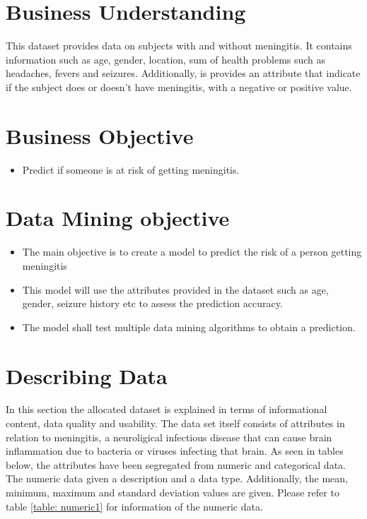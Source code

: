 
\section*{Business Understanding}
This dataset provides data on subjects with and without meningitis. It contains information such as age, gender, location, sum of health problems such as headaches, fevers and seizures. Additionally, is provides an attribute that indicate if the subject does or doesn't have meningitis, with a negative or positive value. 

\section*{Business Objective}

\begin{itemize}
	\item  Predict if someone is at risk of getting meningitis.
\end{itemize}

\section*{Data Mining objective}
\begin{itemize}
	\item The main objective is to create a model to predict the risk of a person getting meningitis 
	\item This model will use the attributes provided in the dataset such as age, gender, seizure history etc to assess the prediction accuracy.
	\item The model shall test multiple data mining algorithms to obtain a prediction.
\end{itemize}





\section*{Describing Data}
In this section the allocated dataset is explained in terms of informational content, data quality and usability. The data set itself consists of attributes in relation to meningitis, a neuroligical infectious disease that can cause brain inflammation due to bacteria or viruses infecting that brain. As seen in tables below, the attributes have been segregated from numeric and categorical data. The numeric data given a description and a data type. Additionally, the mean, minimum, maximum and standard deviation values are given. Please refer to table \ref{table: numeric1} for information of the numeric data.


